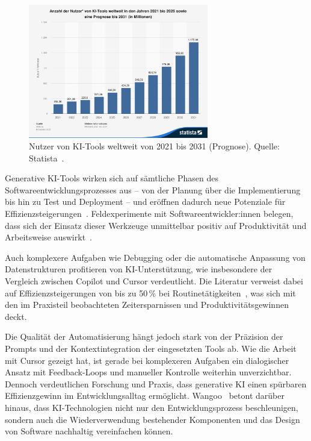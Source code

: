 \begin{figure}[htbp]
    \centering
    \vspace{1em}
    \includegraphics[width=0.7\textwidth]{images/abbildungen/statistic_id1469771_nutzer-von-ki-tools-weltweit-von-2021-bis-2031.png}
    \caption{Nutzer von KI-Tools weltweit von 2021 bis 2031 (Prognose). Quelle: Statista~\cite{statista_ki_nutzer_2031}.}
    \label{fig:ki-nutzerwachstum}
\end{figure}

Generative KI-Tools wirken sich auf sämtliche Phasen des
Softwareentwicklungsprozesses aus – von der Planung über die Implementierung
bis hin zu Test und Deployment – und eröffnen dadurch neue Potenziale für
Effizienzsteigerungen~\cite{minikiewicz_impact_nodate}. Feldexperimente mit
Softwareentwickler:innen belegen, dass sich der Einsatz dieser Werkzeuge
unmittelbar positiv auf Produktivität und Arbeitsweise
auswirkt~\cite{cui_effects_2024}.

Auch komplexere Aufgaben wie Debugging oder die automatische Anpassung von
Datenstrukturen profitieren von KI-Unterstützung, wie insbesondere der
Vergleich zwischen Copilot und Cursor verdeutlicht. Die Literatur verweist
dabei auf Effizienzsteigerungen von bis zu 50\,\% bei
Routinetätigkeiten~\cite{s_future_2024}, was sich mit den im Praxisteil
beobachteten Zeitersparnissen und Produktivitätsgewinnen deckt.

Die Qualität der Automatisierung hängt jedoch stark von der Präzision der
Prompts und der Kontextintegration der eingesetzten Tools ab. Wie die Arbeit
mit Cursor gezeigt hat, ist gerade bei komplexeren Aufgaben ein dialogischer
Ansatz mit Feedback-Loops und manueller Kontrolle weiterhin unverzichtbar.
Dennoch verdeutlichen Forschung und Praxis, dass generative KI einen spürbaren
Effizienzgewinn im Entwicklungsalltag ermöglicht.
Wangoo~\cite{wangoo_artificial_2018} betont darüber hinaus, dass
KI-Technologien nicht nur den Entwicklungsprozess beschleunigen, sondern auch
die Wiederverwendung bestehender Komponenten und das Design von Software
nachhaltig vereinfachen können.